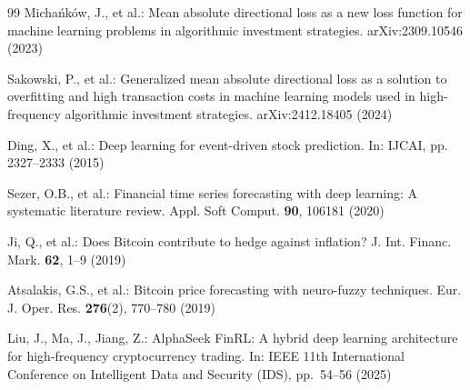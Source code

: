 \documentclass[runningheads]{llncs}
\begin{document}
\begin{thebibliography}{99}
Michańków, J., et al.: Mean absolute directional loss as a new loss function
for machine learning problems in algorithmic investment strategies.
arXiv:2309.10546 (2023)

Sakowski, P., et al.: Generalized mean absolute directional loss as a solution
to overfitting and high transaction costs in machine learning models used in
high-frequency algorithmic investment strategies. arXiv:2412.18405 (2024)

Ding, X., et al.: Deep learning for event-driven stock prediction.
In: IJCAI, pp. 2327--2333 (2015)

Sezer, O.B., et al.: Financial time series forecasting with deep learning:
A systematic literature review. Appl. Soft Comput. \textbf{90}, 106181 (2020)

Ji, Q., et al.: Does Bitcoin contribute to hedge against inflation?
J. Int. Financ. Mark. \textbf{62}, 1--9 (2019)

Atsalakis, G.S., et al.: Bitcoin price forecasting with neuro-fuzzy techniques.
Eur. J. Oper. Res. \textbf{276}(2), 770--780 (2019)


Liu, J., Ma, J., Jiang, Z.: AlphaSeek FinRL: A hybrid deep learning architecture
for high-frequency cryptocurrency trading. In: IEEE 11th International Conference
on Intelligent Data and Security (IDS), pp.~54--56 (2025)

\end{thebibliography}
\end{document}
